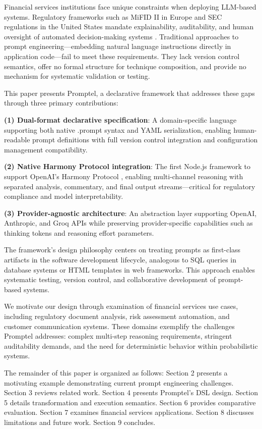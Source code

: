\documentclass[11pt,a4paper]{article}
\begin{document}
Financial services institutions face unique constraints when deploying LLM-based systems. Regulatory frameworks such as MiFID II in Europe and SEC regulations in the United States mandate explainability, auditability, and human oversight of automated decision-making systems \cite{guidotti2018survey}. Traditional approaches to prompt engineering—embedding natural language instructions directly in application code—fail to meet these requirements. They lack version control semantics, offer no formal structure for technique composition, and provide no mechanism for systematic validation or testing.

This paper presents Promptel, a declarative framework that addresses these gaps through three primary contributions:

\textbf{(1) Dual-format declarative specification}: A domain-specific language supporting both native .prompt syntax and YAML serialization, enabling human-readable prompt definitions with full version control integration and configuration management compatibility.

\textbf{(2) Native Harmony Protocol integration}: The first Node.js framework to support OpenAI's Harmony Protocol \cite{openai2024harmony}, enabling multi-channel reasoning with separated analysis, commentary, and final output streams—critical for regulatory compliance and model interpretability.

\textbf{(3) Provider-agnostic architecture}: An abstraction layer supporting OpenAI, Anthropic, and Groq APIs while preserving provider-specific capabilities such as thinking tokens and reasoning effort parameters.

The framework's design philosophy centers on treating prompts as first-class artifacts in the software development lifecycle, analogous to SQL queries in database systems or HTML templates in web frameworks. This approach enables systematic testing, version control, and collaborative development of prompt-based systems.

We motivate our design through examination of financial services use cases, including regulatory document analysis, risk assessment automation, and customer communication systems. These domains exemplify the challenges Promptel addresses: complex multi-step reasoning requirements, stringent auditability demands, and the need for deterministic behavior within probabilistic systems.

The remainder of this paper is organized as follows: Section 2 presents a motivating example demonstrating current prompt engineering challenges. Section 3 reviews related work. Section 4 presents Promptel's DSL design. Section 5 details transformation and execution semantics. Section 6 provides comparative evaluation. Section 7 examines financial services applications. Section 8 discusses limitations and future work. Section 9 concludes.
\end{document}
